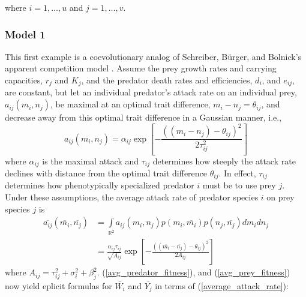 \documentclass{amsart}
\theoremstyle{definition}
\theoremstyle{remark}
\numberwithin{equation}{section}
\begin{document}
where $i = 1, \dots, u$ and $j = 1, \dots, v$.

\subsubsection{Model 1}
This first example is a coevolutionary analog of Schreiber, B\"urger, and Bolnick's apparent competition model \cite{Schreiber_2011}.  Assume the prey growth rates and carrying capacities, $r_j$ and $K_j$, and the predator death rates and efficiencies, $d_i$, and $e_{ij}$, are constant, but let an individual predator's attack rate on an individual prey, $a_{ij}(m_i, n_j)$, be maximal at an optimal trait difference, $m_i - n_j = \theta_{ij}$, and decrease away from this optimal trait difference in a Gaussian manner, i.e.,
\begin{equation}
	\label{attack_rate}
	a_{ij}(m_i, n_j) = \alpha_{ij}\exp{\left[-\frac{((m_i - n_j) - \theta_{ij})^2}{2\tau_{ij}^2}\right]}
\end{equation}
where $\alpha_{ij}$ is the maximal attack and $\tau_{ij}$ determines how steeply the attack rate declines with distance from the optimal trait difference $\theta_{ij}$.  In effect, $\tau_{ij}$ determines how phenotypically specialized predator $i$ must be to use prey $j$.  Under these assumptions, the average attack rate of predator species $i$ on prey species $j$ is
\begin{equation}
	\label{average_attack_rate}
	\begin{aligned}
		\overline{a_{ij}}(\overline{m_i}, \overline{n_j}) &= \int\limits_{\mathbb{R}^2}a_{ij}(m_i, n_j)p(m_i, \overline{m_i})p(n_j, \overline{n_j})dm_idn_j \\
		&= \frac{\alpha_{ij}\tau_{ij}}{\sqrt{A_{ij}}}\exp{\left[-\frac{((\overline{m_i} - \overline{n_j}) - \theta_{ij})^2}{2A_{ij}}\right]}
	\end{aligned}
\end{equation}
where $A_{ij} = \tau_{ij}^2 + \sigma_i^2 + \beta_j^2$.  (\ref{avg_predator_fitness}), and (\ref{avg_prey_fitness}) now yield eplicit formulas for $\overline{W_i}$ and $\overline{Y_j}$ in terms of (\ref{average_attack_rate}):
\end{document}
